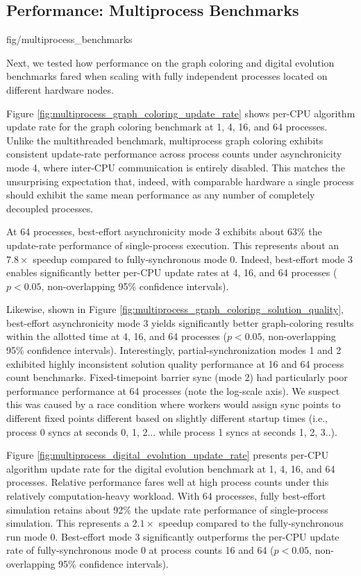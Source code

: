 \subsection{Performance: Multiprocess Benchmarks}
\label{sec:multiprocess-benchmarks}

{fig/multiprocess_benchmarks}

Next, we tested how performance on the graph coloring and digital evolution benchmarks fared when scaling with fully independent processes located on different hardware nodes.

Figure \ref{fig:multiprocess_graph_coloring_update_rate} shows per-CPU algorithm update rate for the graph coloring benchmark at 1, 4, 16, and 64 processes.
Unlike the multithreaded benchmark, multiprocess graph coloring exhibits consistent update-rate performance across process counts under asynchronicity mode 4, where inter-CPU communication is entirely disabled.
This matches the unsurprising expectation that, indeed, with comparable hardware a single process should exhibit the same mean performance as any number of completely decoupled processes.

At 64 processes, best-effort asynchronicity mode 3 exhibits about 63\% the update-rate performance of single-process execution.
This represents about an $7.8\times$ speedup compared to fully-synchronous mode 0.
Indeed, best-effort mode 3 enables significantly better per-CPU update rates at 4, 16, and 64 processes ($p < 0.05$, non-overlapping 95\% confidence intervals).

Likewise, shown in Figure \ref{fig:multiprocess_graph_coloring_solution_quality}, best-effort asynchronicity mode 3 yields significantly better graph-coloring results within the allotted time at 4, 16, and 64 processes ($p < 0.05$, non-overlapping 95\% confidence intervals).
Interestingly, partial-synchronization modes 1 and 2 exhibited highly inconsistent solution quality performance at 16 and 64 process count benchmarks.
Fixed-timepoint barrier sync (mode 2) had particularly poor performance performance at 64 processes (note the log-scale axis).
We suspect this was caused by a race condition where workers would assign sync points to different fixed points different based on slightly different startup times (i.e., process 0 syncs at seconds 0, 1, 2... while process 1 syncs at seconds 1, 2, 3..).

Figure \ref{fig:multiprocess_digital_evolution_update_rate} presents per-CPU algorithm update rate for the digital evolution benchmark at 1, 4, 16, and 64 processes.
Relative performance fares well at high process counts under this relatively computation-heavy workload.
With 64 processes, fully best-effort simulation retains about 92\% the update rate performance of single-process simulation.
This represents a $2.1\times$ speedup compared to the fully-synchronous run mode 0.
Best-effort mode 3 significantly outperforms the per-CPU update rate of fully-synchronous mode 0 at process counts 16 and 64 ($p < 0.05$, non-overlapping 95\% confidence intervals).
